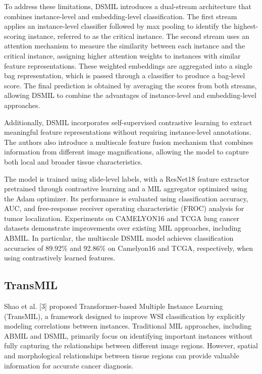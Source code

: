 \documentclass[journal]{IEEEtran}
\begin{document}
To address these limitations, DSMIL introduces a dual-stream architecture that combines instance-level and embedding-level classification. The first stream applies an instance-level classifier followed by max pooling to identify the highest-scoring instance, referred to as the critical instance. The second stream uses an attention mechanism to measure the similarity between each instance and the critical instance, assigning higher attention weights to instances with similar feature representations. These weighted embeddings are aggregated into a single bag representation, which is passed through a classifier to produce a bag-level score. The final prediction is obtained by averaging the scores from both streams, allowing DSMIL to combine the advantages of instance-level and embedding-level approaches.

Additionally, DSMIL incorporates self-supervised contrastive learning to extract meaningful feature representations without requiring instance-level annotations. The authors also introduce a multiscale feature fusion mechanism that combines information from different image magnifications, allowing the model to capture both local and broader tissue characteristics.

The model is trained using slide-level labels, with a ResNet18 feature extractor pretrained through contrastive learning and a MIL aggregator optimized using the Adam optimizer. Its performance is evaluated using classification accuracy, AUC, and free-response receiver operating characteristic (FROC) analysis for tumor localization. Experiments on  CAMELYON16 and TCGA lung cancer datasets demonstrate improvements over existing MIL approaches, including ABMIL. In particular, the multiscale DSMIL model achieves classification accuracies of 89.92\% and 92.86\% on Camelyon16 and TCGA, respectively, when using contrastively learned features.

\subsection{TransMIL}
Shao et al. [3] proposed Transformer-based Multiple Instance Learning (TransMIL), a framework designed to improve WSI classification by explicitly modeling correlations between instances. Traditional MIL approaches, including ABMIL and DSMIL, primarily focus on identifying important instances without fully capturing the relationships between different image regions. However, spatial and morphological relationships between tissue regions can provide valuable information for accurate cancer diagnosis.
\end{document}
